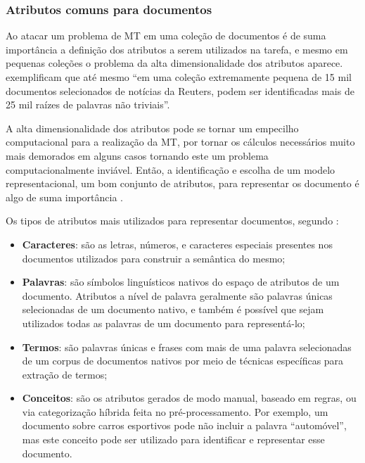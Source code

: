         \subsubsection{Atributos comuns para documentos} \label{subsubsec:Atributos-comuns-documentos}
            Ao atacar um problema de MT em uma coleção de documentos é de suma importância a definição dos atributos a serem utilizados na tarefa, e mesmo em pequenas coleções o problema da alta dimensionalidade dos atributos aparece.
             exemplificam que até mesmo ``em uma coleção extremamente pequena de 15 mil documentos selecionados de notícias da Reuters, podem ser identificadas mais de 25 mil raízes de palavras não triviais''.
            
            A alta dimensionalidade dos atributos pode se tornar um empecilho computacional para a realização da MT, por tornar os cálculos necessários muito mais demorados em alguns casos tornando este um problema computacionalmente inviável.
            Então, a identificação e escolha de um modelo representacional, um bom conjunto de atributos, para representar os documento é algo de suma importância \cite[p.~4]{Feldman:2006:TMH:1076381}.
            
            Os tipos de atributos mais utilizados para representar documentos, segundo  :
            \begin{itemize}
                \item \textbf{Caracteres}: são as letras, números, e caracteres especiais presentes nos documentos utilizados para construir a semântica do mesmo;
                
                \item \textbf{Palavras}: são símbolos linguísticos nativos do espaço de atributos de um documento. 
                Atributos a nível de palavra geralmente são palavras únicas selecionadas de um documento nativo, e também é possível que sejam utilizados todas as palavras de um documento para representá-lo;
                
                \item \textbf{Termos}: são palavras únicas e frases com mais de uma palavra selecionadas de um corpus de documentos nativos por meio de técnicas específicas para extração de termos;
                
                \item \textbf{Conceitos}: são os atributos gerados de modo manual, baseado em regras, ou via categorização híbrida feita no pré-processamento. 
                Por exemplo, um documento sobre carros esportivos pode não incluir a palavra ``automóvel'', mas este conceito pode ser utilizado para identificar e representar esse documento.
            \end{itemize}
            
